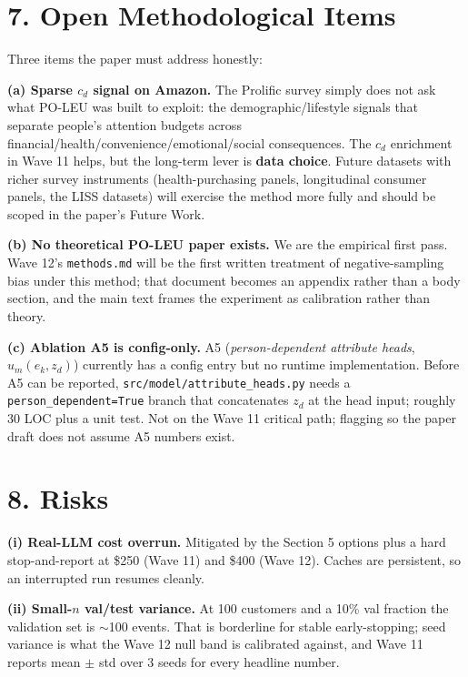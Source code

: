 \documentclass[11pt]{article}
\begin{document}
\section*{7. Open Methodological Items}

Three items the paper must address honestly:

\textbf{(a) Sparse $c_d$ signal on Amazon.} The Prolific survey simply does not ask what PO-LEU was built to exploit: the demographic/lifestyle signals that separate people's attention budgets across financial/health/convenience/emotional/social consequences. The $c_d$ enrichment in Wave 11 helps, but the long-term lever is \textbf{data choice}. Future datasets with richer survey instruments (health-purchasing panels, longitudinal consumer panels, the LISS datasets) will exercise the method more fully and should be scoped in the paper's Future Work.

\textbf{(b) No theoretical PO-LEU paper exists.} We are the empirical first pass. Wave 12's \texttt{methods.md} will be the first written treatment of negative-sampling bias under this method; that document becomes an appendix rather than a body section, and the main text frames the experiment as calibration rather than theory.

\textbf{(c) Ablation A5 is config-only.} A5 (\textit{person-dependent attribute heads}, $u_m(e_k, z_d)$) currently has a config entry but no runtime implementation. Before A5 can be reported, \texttt{src/model/attribute\_heads.py} needs a \texttt{person\_dependent=True} branch that concatenates $z_d$ at the head input; roughly 30 LOC plus a unit test. Not on the Wave 11 critical path; flagging so the paper draft does not assume A5 numbers exist.

\section*{8. Risks}

\textbf{(i) Real-LLM cost overrun.} Mitigated by the Section 5 options plus a hard stop-and-report at \$250 (Wave 11) and \$400 (Wave 12). Caches are persistent, so an interrupted run resumes cleanly.

\textbf{(ii) Small-$n$ val/test variance.} At 100 customers and a 10\% val fraction the validation set is $\sim$100 events. That is borderline for stable early-stopping; seed variance is what the Wave 12 null band is calibrated against, and Wave 11 reports mean $\pm$ std over 3 seeds for every headline number.
\end{document}
